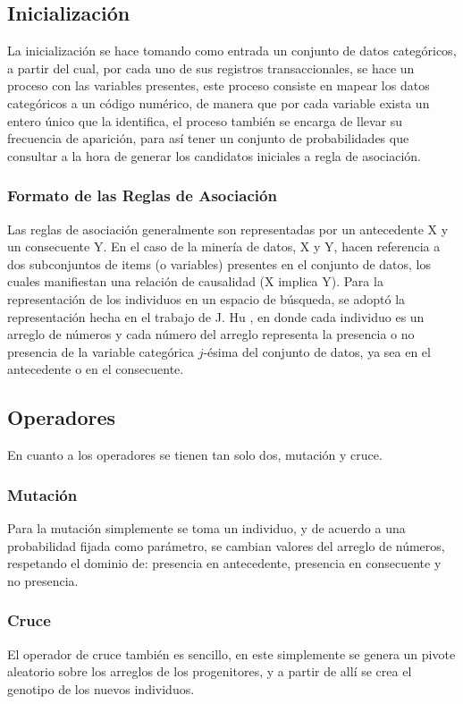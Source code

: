 \documentclass{llncs}
\begin{document}
\subsection{Inicialización}
La inicialización se hace tomando como entrada un conjunto de datos categóricos, a partir del cual, por cada uno de sus registros transaccionales, se hace un proceso con las variables  presentes, este proceso consiste en mapear los datos categóricos a un código numérico, de manera que por cada variable exista un entero único que la identifica, el proceso también se encarga de llevar su frecuencia de aparición, para así tener un conjunto de probabilidades que consultar a la hora de generar los candidatos iniciales a regla de asociación.
\subsubsection{Formato de las Reglas de Asociación}
Las reglas de asociación generalmente son representadas por un antecedente X y un consecuente Y. En el caso de la minería de datos, X y Y, hacen referencia a dos subconjuntos de items (o variables) presentes en el conjunto de datos, los cuales manifiestan una relación de causalidad (X implica Y). Para la representación de los individuos en un espacio de búsqueda, se adoptó la representación hecha en el trabajo de J. Hu \cite{hu}, en donde cada individuo es un arreglo de números y cada número del arreglo representa la presencia o no presencia de la variable categórica $j$-ésima del conjunto de datos, ya sea en el antecedente o en el consecuente.

\subsection{Operadores}
En cuanto a los operadores se tienen tan solo dos, mutación y cruce. 
\subsubsection{Mutación}
Para la mutación simplemente se toma un individuo, y de acuerdo a una probabilidad fijada como parámetro, se cambian valores del arreglo de números, respetando el dominio de: presencia en antecedente, presencia en consecuente y no presencia.
\subsubsection{Cruce}
El operador de cruce también es sencillo, en este simplemente se genera un pivote aleatorio sobre los arreglos de los progenitores, y a partir de allí se crea el genotipo de los nuevos individuos.
\end{document}
